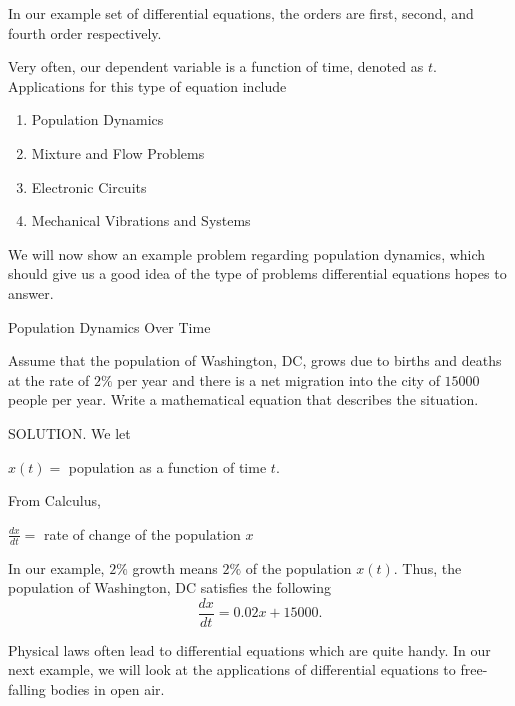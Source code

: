 In our example set of differential equations, the orders are first, second, and fourth order respectively.\newline

Very often, our dependent variable is a function of time, denoted as $t.$ Applications for this type of equation include

\begin{enumerate}
\item Population Dynamics
\item Mixture and Flow Problems
\item Electronic Circuits
\item Mechanical Vibrations and Systems
\end{enumerate}

We will now show an example problem regarding population dynamics, which should give us a good idea of the type of problems differential equations hopes to answer.

\begin{example} Population Dynamics Over Time\newline

Assume that the population of Washington, DC, grows due to births and deaths at the rate of $2\%$ per year and there is a net migration into the city of $15000$ people per year. Write a mathematical equation that describes the situation.\newline

SOLUTION. We let
\begin{center}
$x(t)=$ population as a function of time $t.$
\end{center}
From Calculus,
\begin{center}
$\frac{dx}{dt} =$ rate of change of the population $x$
\end{center}
In our example, $2\%$ growth means $2\%$ of the population $x(t).$ Thus, the population of Washington, DC satisfies the following $$\frac{dx}{dt} = 0.02x + 15000.$$
\end{example}

Physical laws often lead to differential equations which are quite handy. In our next example, we will look at the applications of differential equations to free-falling bodies in open air.

